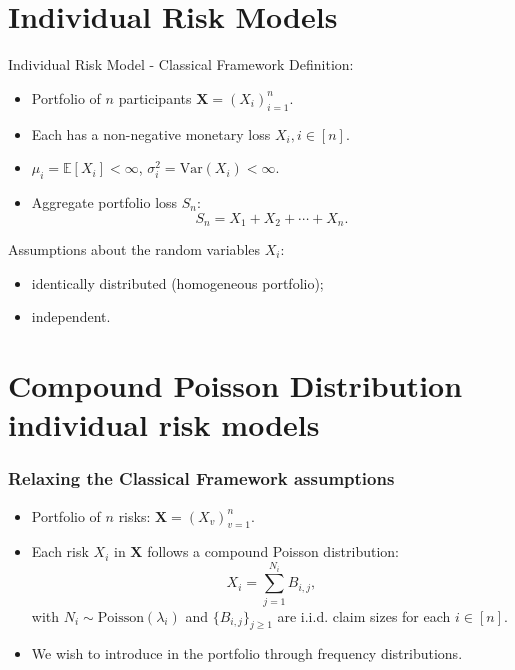 \documentclass[11pt,xcolor={dvipsnames},hyperref={pdftex,pdfpagemode=UseNone,hidelinks,pdfdisplaydoctitle=true},usepdftitle=false]{beamer}
\begin{document}
\section{Individual Risk Models}
\begin{frame}{Individual Risk Model - Classical Framework}
Definition: 
\begin{itemize}
    \item Portfolio of $n$ participants $\boldsymbol{X} = (X_i)_{i=1}^{n}$.
    \item Each has a non-negative monetary loss $X_i, i \in [n]$.
    \item $\mu_i = \mathbb{E}[X_i] < \infty$, $\sigma_i^2 = \mathrm{Var}(X_i) < \infty$.
    \item Aggregate portfolio loss $S_n$:  
    \begin{equation*}
    S_n = X_1 + X_2 + \cdots + X_n.
    \end{equation*}
\end{itemize}
\vfill

\pause

Assumptions about the random variables $X_i$: 
\begin{itemize}
    \item identically distributed (homogeneous portfolio);
    \item independent. 
\end{itemize}
\end{frame}

\section{Compound Poisson Distribution individual risk models}
\begin{frame}
\frametitle{Relaxing the Classical Framework assumptions}
\begin{itemize}
    \item Portfolio of $n$  risks: $\boldsymbol{X} = (X_v)_{v=1}^{n}$.

    \vfill

    \item Each risk $X_i$ in $\boldsymbol{X}$ follows a compound Poisson distribution: 
        \begin{equation*}
        X_i = \sum_{j=1}^{N_i} B_{i,j},
        \end{equation*}
        with $N_i \sim \text{Poisson}(\lambda_i)$ and $ \{B_{i,j}\}_{j \ge 1}$ are i.i.d. claim sizes for each $i \in [n]$.
    

        \pause

        \vfill

    \item We wish to introduce  in the portfolio through frequency distributions.
\end{itemize}

\end{frame}
\end{document}
